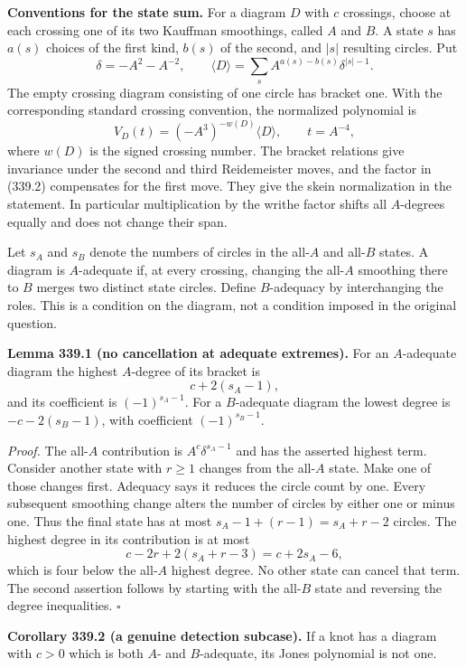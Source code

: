 \documentclass[11pt]{article}
\begin{document}
\textbf{Conventions for the state sum.} For a diagram $D$ with $c$ crossings, choose at each crossing one of its two Kauffman smoothings, called $A$ and $B$. A state $s$ has $a(s)$ choices of the first kind, $b(s)$ of the second, and $|s|$ resulting circles. Put
\[
 \delta=-A^2-A^{-2},\qquad
 \langle D\rangle=\sum_s A^{a(s)-b(s)}\delta^{|s|-1}.
 \tag{339.1}
\]
The empty crossing diagram consisting of one circle has bracket one. With the corresponding standard crossing convention, the normalized polynomial is
\[
 V_D(t)=(-A^3)^{-w(D)}\langle D\rangle,\qquad t=A^{-4},
 \tag{339.2}
\]
where $w(D)$ is the signed crossing number. The bracket relations give invariance under the second and third Reidemeister moves, and the factor in (339.2) compensates for the first move. They give the skein normalization in the statement. In particular multiplication by the writhe factor shifts all $A$-degrees equally and does not change their span.

Let $s_A$ and $s_B$ denote the numbers of circles in the all-$A$ and all-$B$ states. A diagram is $A$-adequate if, at every crossing, changing the all-$A$ smoothing there to $B$ merges two distinct state circles. Define $B$-adequacy by interchanging the roles. This is a condition on the diagram, not a condition imposed in the original question.

\textbf{Lemma 339.1 (no cancellation at adequate extremes).} For an $A$-adequate diagram the highest $A$-degree of its bracket is
\[
 c+2(s_A-1),
\]
and its coefficient is $(-1)^{s_A-1}$. For a $B$-adequate diagram the lowest degree is $-c-2(s_B-1)$, with coefficient $(-1)^{s_B-1}$.

\emph{Proof.} The all-$A$ contribution is $A^c\delta^{s_A-1}$ and has the asserted highest term. Consider another state with $r\geq1$ changes from the all-$A$ state. Make one of those changes first. Adequacy says it reduces the circle count by one. Every subsequent smoothing change alters the number of circles by either one or minus one. Thus the final state has at most $s_A-1+(r-1)=s_A+r-2$ circles. The highest degree in its contribution is at most
\[
 c-2r+2(s_A+r-3)=c+2s_A-6,
\]
which is four below the all-$A$ highest degree. No other state can cancel that term. The second assertion follows by starting with the all-$B$ state and reversing the degree inequalities. $\square$

\textbf{Corollary 339.2 (a genuine detection subcase).} If a knot has a diagram with $c>0$ which is both $A$- and $B$-adequate, its Jones polynomial is not one.
\end{document}
